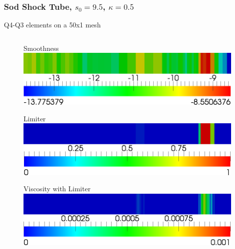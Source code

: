 \documentclass[8pt,xcolor=svgnames]{beamer}
\begin{document}
\begin{frame}\frametitle{Sod Shock Tube, $s_0=9.5$, $\kappa=0.5$}
\vspace{-1ex}
Q4-Q3 elements on a 50x1 mesh
\vspace{-2ex}
\begin{columns}
\begin{column}{0.3\textwidth}
\begin{figure}[t]
\begin{center}
Smoothness
\includegraphics[width=1.0\textwidth]{figs/Sod/Q4l-50-smoothness.png}
\end{center}
\end{figure}
\begin{figure}[t]
\begin{center}
Limiter
\includegraphics[width=1.0\textwidth]{figs/Sod/Q4l-50-limiter.png}
\end{center}
\end{figure}
\begin{figure}[t]
\begin{center}
Viscosity with Limiter
\includegraphics[width=1.0\textwidth]{figs/Sod/Q4l-50-viscosity.png}
\end{center}
\end{figure}
\begin{figure}[t]
\begin{center}

\end{center}
\end{figure}
\end{column}
\end{columns}
\end{frame}
\end{document}
